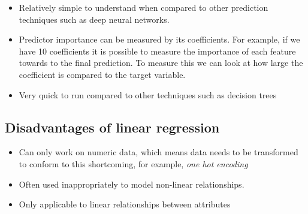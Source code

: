 \begin{itemize}
  \item Relatively simple to understand when compared to other prediction techniques such as deep neural networks.
  \item Predictor importance can be measured by its coefficients. For example, if we have 10 coefficients it is possible to measure the importance of each feature towards to the final prediction. To measure this we can look at how large the coefficient is compared to the target variable.
  \item Very quick to run compared to other techniques such as decision trees
\end{itemize}

\subsection{Disadvantages of linear regression}

\begin{itemize}
  \item Can only work on numeric data, which means data needs to be transformed to conform to this shortcoming, for example, \textit{one hot encoding}
  \item Often used inappropriately to model non-linear relationships.
  \item Only applicable to linear relationships between attributes
\end{itemize}